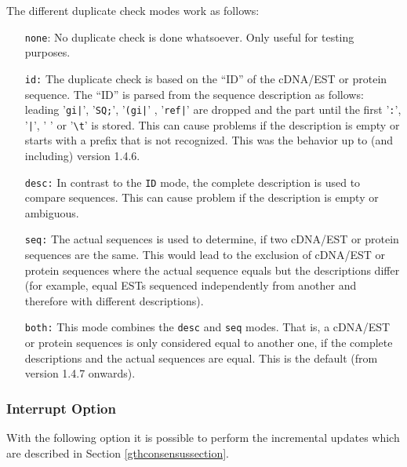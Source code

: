\documentclass[11pt,a4paper,titlepage]{article}
\begin{document}
The different duplicate check modes work as follows:

\begin{itemize}
\item[\texttt{none}:] No duplicate check is done whatsoever. Only useful for
testing purposes.
\item[\texttt{id:}] The duplicate check is based on the ``ID'' of the cDNA/EST
or protein sequence. The ``ID'' is parsed from the
sequence description as follows: leading '\texttt{gi|}', '\texttt{SQ;}',
'\texttt{(gi|}' , '\texttt{ref|}' are
dropped and the part until the first '\texttt{:}', '\texttt{|}', ' ' or
'\texttt{\textbackslash t}' is stored.
This can cause problems if the description is empty or starts with a
prefix that is not recognized.
This was the behavior up to (and including) version 1.4.6.
\item[\texttt{desc:}] In contrast to the \texttt{ID} mode, the complete
description is used to compare sequences. This can cause problem if the
description is empty or ambiguous.
\item[\texttt{seq:}] The actual sequences is used to determine, if two cDNA/EST
or protein sequences are the same. This would lead to the exclusion of cDNA/EST
or protein sequences where the actual sequence equals but the descriptions
differ (for example, equal ESTs sequenced independently from another and
therefore with different descriptions).
\item[\texttt{both:}] This mode combines the \texttt{desc} and \texttt{seq}
modes. That is, a cDNA/EST or protein sequences is only considered equal to
another one, if the complete descriptions and the actual sequences are equal.
This is the default (from version 1.4.7 onwards).
\end{itemize}


\subsubsection{Interrupt Option}
\label{interruptsection}
With the following option it is possible to perform the  incremental updates which are described in Section
\ref{gthconsensussection}.

\begin{Justshowoptions}
\end{Justshowoptions}
\end{document}
